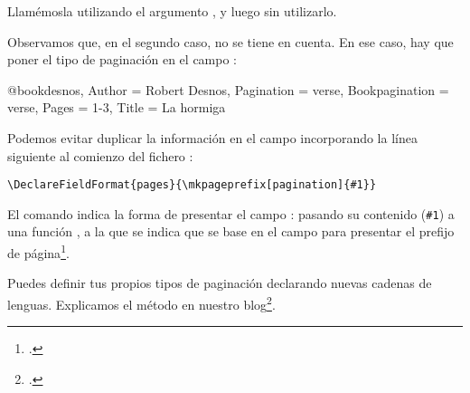 Llamémosla utilizando el argumento , y luego sin utilizarlo.


\begin{latexcode}
\autocite[2]{desnos}

\autocite{desnos}
\end{latexcode}


\begin{quotation}
\cite[2]{desnos}

\cite{desnos}
\end{quotation}


Observamos que, en el segundo caso,  no se tiene en
cuenta.  En ese caso, hay que poner el tipo de paginación en el campo  :

\begin{latexcode}
@book{desnos,
    Author = {Robert Desnos},
    Pagination = {verse},
    Bookpagination = {verse},
    Pages = {1-3},
    Title = {La hormiga}}
\end{latexcode}

\begin{quotation}
\cite[2]{desnos}

\cite{desnos}
\end{quotation}


\begin{plusloins}
  Podemos evitar duplicar la información en el campo
   incorporando la línea siguiente al comienzo
  del fichero  :

\begin{verbatim}
\DeclareFieldFormat{pages}{\mkpageprefix[pagination]{#1}}
\end{verbatim}

El comando  indica la forma de presentar el
campo : pasando su contenido (\verb|#1|) a una función
, a la que se indica que se base en el campo
 para presentar el prefijo de página\footcite[Véase][]{biblatex_formating}.
\end{plusloins}

\begin{plusloins}
  Puedes definir tus propios tipos de paginación declarando nuevas
  cadenas de lenguas. Explicamos el método en
  nuestro blog\footcite{biblio_pagination}.
\end{plusloins}


